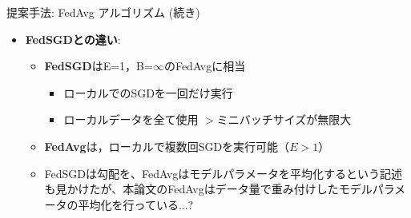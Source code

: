 \documentclass[unicode,12pt,aspectratio=169, dvipdfmx]{beamer}
\begin{document}
\begin{frame}{提案手法: FedAvg アルゴリズム (続き)}
\begin{itemize}
    \item \textbf{FedSGDとの違い}:
    \begin{itemize}
        \item \textbf{FedSGD}はE=1，B=$\infty$のFedAvgに相当
        \begin{itemize}
            \item ローカルでのSGDを一回だけ実行
            \item ローカルデータを全て使用 $>$ミニバッチサイズが無限大
        \end{itemize}
        \item \textbf{FedAvg}は，ローカルで複数回SGDを実行可能（$E>1$）
        \item FedSGDは勾配を、FedAvgはモデルパラメータを平均化するという記述も見かけたが、本論文のFedAvgはデータ量で重み付けしたモデルパラメータの平均化を行っている...?
    \end{itemize}
\end{itemize}
\end{frame}


\end{document}
